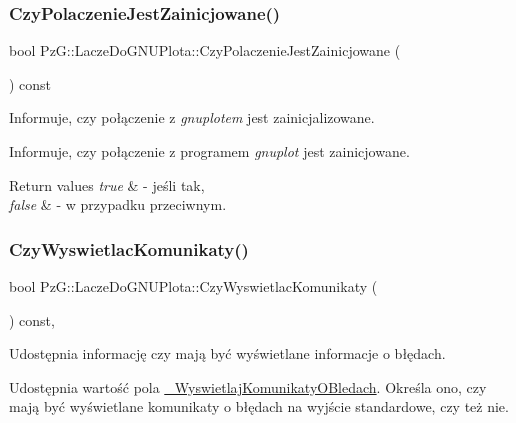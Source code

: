 \subsubsection{\texorpdfstring{Czy\+Polaczenie\+Jest\+Zainicjowane()}{CzyPolaczenieJestZainicjowane()}}
{\footnotesize\ttfamily bool Pz\+G\+::\+Lacze\+Do\+G\+N\+U\+Plota\+::\+Czy\+Polaczenie\+Jest\+Zainicjowane (\begin{DoxyParamCaption}{ }\end{DoxyParamCaption}) const}



Informuje, czy połączenie z {\itshape gnuplot\textquotesingle{}em} jest zainicjalizowane. 

Informuje, czy połączenie z programem {\itshape gnuplot} jest zainicjowane. 
\begin{DoxyRetVals}{Return values}
{\em true} & -\/ jeśli tak, \\
\hline
{\em false} & -\/ w przypadku przeciwnym. \\
\hline
\end{DoxyRetVals}
\mbox{\label{classPzG_1_1LaczeDoGNUPlota_a5e4f3a226ed36f7110032d802d84847c}} 
\subsubsection{\texorpdfstring{Czy\+Wyswietlac\+Komunikaty()}{CzyWyswietlacKomunikaty()}}
{\footnotesize\ttfamily bool Pz\+G\+::\+Lacze\+Do\+G\+N\+U\+Plota\+::\+Czy\+Wyswietlac\+Komunikaty (\begin{DoxyParamCaption}{ }\end{DoxyParamCaption}) const\hspace{0.3cm}{\ttfamily [inline]}, {\ttfamily [protected]}}



Udostępnia informację czy mają być wyświetlane informacje o błędach. 

Udostępnia wartość pola \hyperlink{classPzG_1_1LaczeDoGNUPlota_a2f2800f14ebfe1caef0b4d30c410a7fe}{\+\_\+\+Wyswietlaj\+Komunikaty\+O\+Bledach}. Określa ono, czy mają być wyświetlane komunikaty o błędach na wyjście standardowe, czy też nie. \mbox{\label{classPzG_1_1LaczeDoGNUPlota_a34bd48f57c0fd69c12bf4127a1cacd8f}} 
